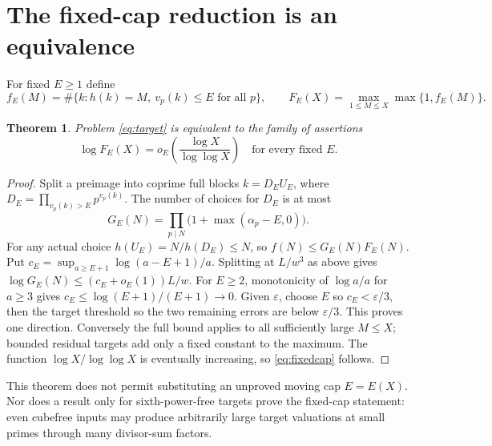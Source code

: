 \documentclass[11pt,a4paper]{article}
\newtheorem{theorem}{Theorem}[section]
\theoremstyle{remark}
\begin{document}
\section{The fixed-cap reduction is an equivalence}
For fixed $E\ge1$ define
\[
 f_E(M)=\#\{k:h(k)=M,\ v_p(k)\le E\text{ for all }p\},\qquad
 F_E(X)=\max_{1\le M\le X}\max\{1,f_E(M)\}.
\]
\begin{theorem}\label{thm:reduction}
Problem \eqref{eq:target} is equivalent to the family of assertions
\begin{equation}\label{eq:fixedcap}
 \log F_E(X)=o_E\left(\frac{\log X}{\log\log X}\right)
 \quad\text{for every fixed }E.
\end{equation}
\end{theorem}
\begin{proof}
Split a preimage into coprime full blocks
$k=D_EU_E$, where $D_E=\prod_{v_p(k)>E}p^{v_p(k)}$. The number of choices
for $D_E$ is at most
\[
 G_E(N)=\prod_{p\mid N}\bigl(1+\max(\alpha_p-E,0)\bigr).
\]
For any actual choice $h(U_E)=N/h(D_E)\le N$, so
$f(N)\le G_E(N)F_E(N)$.
Put $c_E=\sup_{a\ge E+1}\log(a-E+1)/a$. Splitting at $L/w^3$ as above
gives $\log G_E(N)\le(c_E+o_E(1))L/w$. For $E\ge2$, monotonicity of
$\log a/a$ for $a\ge3$ gives
$c_E\le\log(E+1)/(E+1)\to0$.
Given $\varepsilon$, choose $E$ so $c_E<\varepsilon/3$, then the target
threshold so the two remaining errors are below $\varepsilon/3$.
This proves one direction. Conversely the full bound applies to all sufficiently
large $M\le X$; bounded residual targets add only a fixed constant to the
maximum. The function $\log X/\log\log X$ is eventually increasing, so
\eqref{eq:fixedcap} follows.
\end{proof}

This theorem does not permit substituting an unproved moving cap $E=E(X)$.
Nor does a result only for sixth-power-free targets prove the fixed-cap
statement: even cubefree inputs may produce arbitrarily large target valuations
at small primes through many divisor-sum factors.
\end{document}
